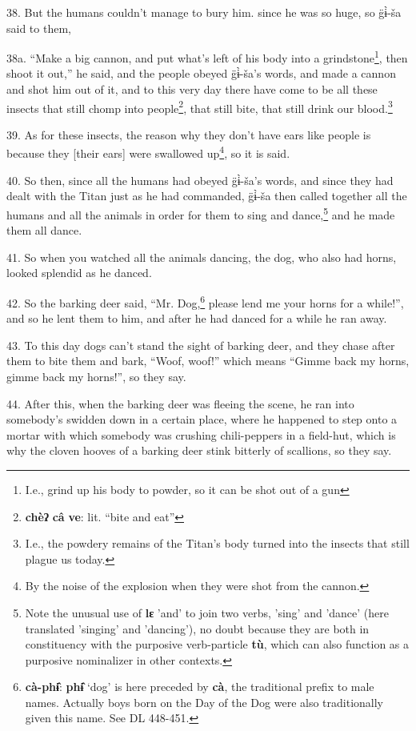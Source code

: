 38. But the humans couldn't manage to bury him. since he was so huge, so g̈ɨ̀-ša
said to them,

38a. ``Make a big cannon, and put what's left of his body into a grindstone\footnote{I.e., grind up his body to powder, so it can be shot out of a gun},
then shoot it out,'' he said, and the people obeyed g̈ɨ̀-ša's words, and made
a cannon and shot him out of it, and to this very day there have come to be all
these insects that still chomp into people\footnote{\textbf{chèʔ} \textbf{câ} \textbf{ve}: lit. ``bite and eat''}, that still bite, that still drink
our blood.\footnote{I.e., the powdery remains of the Titan's body turned into the insects that still plague us today.}

39. As for these insects, the reason why they don't have ears like people is because
they [their ears] were swallowed up\footnote{By the noise of the explosion when they were shot from the cannon.}, so it is said.

40. So then, since all the humans had obeyed g̈ɨ̀-ša's words, and since they
had dealt with the Titan just as he had commanded, g̈ɨ̀-ša then called together
all the humans and all the animals in order for them to sing and dance,\footnote{Note the unusual use of \textbf{lɛ} 'and' to join two verbs, 'sing' and 'dance' (here translated 'singing' and 'dancing'), no doubt because they are both in constituency with the purposive verb-particle \textbf{tù}, which can also function as a purposive nominalizer in other contexts.} and
he made them all dance.

41. So when you watched all the animals dancing, the dog, who also had horns, looked
splendid as he danced.

42. So the barking deer said, ``Mr. Dog,\footnote{\textbf{cà-phɨ̂}: \textbf{phɨ̂} `dog' is here preceded by \textbf{cà}, the traditional prefix to male names. Actually boys born on the Day of the Dog were also traditionally given this name. See DL 448-451.} please lend me your horns for a while!'',
and so he lent them to him, and after he had danced for a while he ran away.

43. To this day dogs can't stand the sight of barking deer, and they chase after
them to bite them and bark, ``Woof, woof!'' which means ``Gimme back my horns,
gimme back my horns!'', so they say.

44. After this, when the barking deer was fleeing the scene, he ran into somebody's
swidden down in a certain place, where he happened to step onto a mortar with which
somebody was crushing chili-peppers in a field-hut, which is why the cloven hooves
of a barking deer stink bitterly of scallions, so they say.

